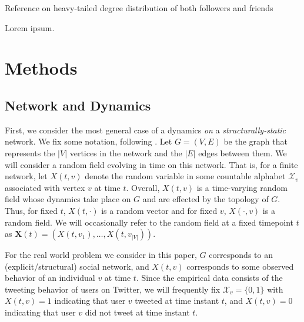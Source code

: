 \documentclass[12pt]{article}
\begin{document}

Reference on heavy-tailed degree distribution of both followers and friends~\cite{kwak2010twitter}


Lorem ipsum.

\section{Methods}

\subsection{Network and Dynamics}

First, we consider the most general case of a dynamics \emph{on} a \emph{structurally-static} network. We fix some notation, following \cite{kolaczyk2009statistical}. Let $G = (V, E)$ be the graph that represents the $|V|$ vertices in the network and the $|E|$ edges between them. We will consider a random field evolving in time on this network. That is, for a finite network, let $X(t, v)$ denote the random variable in some countable alphabet $\mathcal{X}_{v}$ associated with vertex $v$ at time $t$. Overall, $X(t, v)$ is a time-varying random field whose dynamics take place on $G$ and are effected by the topology of $G$. Thus, for fixed $t$, $X(t, \cdot)$ is a random vector and for fixed $v$, $X(\cdot, v)$ is a random field. We will occasionally refer to the random field at a fixed timepoint $t$ as $\mathbf{X}(t) = (X(t, v_{1}), \ldots, X(t, v_{|V|})).$

For the real world problem we consider in this paper, $G$ corresponds to an (explicit/structural) social network, and $X(t,v)$ corresponds to some observed behavior of an individual $v$ at time $t$. Since the empirical data consists of the tweeting behavior of users on Twitter, we will frequently fix $\mathcal{X}_{v} = \{0, 1\}$ with $X(t, v) = 1$ indicating that user $v$ tweeted at time instant $t$, and $X(t, v) = 0$ indicating that user $v$ did not tweet at time instant $t$.
\end{document}
